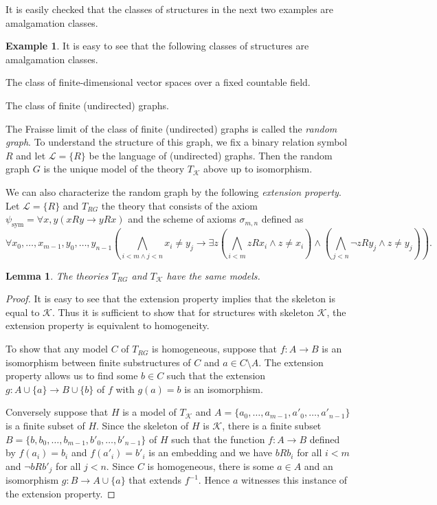 \documentclass[10pt]{amsart}
\renewcommand{\L}{\mathcal{L}}
\newcommand{\K}{\mathcal{K}}
\newtheorem{lemma}[theorem]{Lemma}
\theoremstyle{definition}
\newtheorem{example}[theorem]{Example}
\theoremstyle{remark}
\newenvironment{enumerate-(a)}{\begin{enumerate}[label={\upshape (\alph*)}, leftmargin=2pc]}{\end{enumerate}}
\begin{document}
It is easily checked that the classes of structures in the next two examples are amalgamation classes. 

\begin{example} 
It is easy to see that the following classes of structures are amalgamation classes. 
\begin{enumerate-(a)} 
\item 
The class of finite-dimensional vector spaces over a fixed countable field. 
\item 
The class of finite (undirected) graphs. 
\end{enumerate-(a)} 
\end{example} 

The Fraisse limit of the class of finite (undirected) graphs is called the \emph{random graph}. To understand the structure of this graph, we fix a binary relation symbol $R$ and let $\L=\{R\}$ be the language of (undirected) graphs. Then the random graph $G$ is the unique model of the theory $T_\K$ above up to isomorphism. 

We can also characterize the random graph by the following \emph{extension property}. Let $\L=\{R\}$ and $T_{RG}$ the theory that consists of the axiom $\psi_{\mathrm{sym}}=\forall x,y(xRy\rightarrow yRx)$ and the scheme of axioms $\sigma_{m,n}$ defined as 
$$\forall x_0,\dots,x_{m-1},y_0,\dots,y_{n-1}(\bigwedge_{i<m\wedge j<n} x_i\neq y_j \rightarrow \exists z (\bigwedge_{i<m} z R x_i\wedge z\neq x_i)\wedge (\bigwedge_{j<n}\neg zR y_j\wedge z\neq y_j)).$$ 

\begin{lemma} 
The theories $T_{RG}$ and $T_\K$ have the same models. 
\end{lemma} 
\begin{proof} 
It is easy to see that the extension property implies that the skeleton is equal to $\K$. Thus it is sufficient to show that for structures with skeleton $\K$, the extension property is equivalent to homogeneity. 

To show that any model $C$ of $T_{RG}$ is homogeneous, suppose that $f\colon A\rightarrow B$ is an isomorphism between finite substructures of $C$ and $a\in C\setminus A$. The extension property allows us to find some $b\in C$ such that the extension $g\colon A\cup\{a\}\rightarrow B\cup\{b\}$ of $f$ with $g(a)=b$ is an isomorphism. 

Conversely suppose that $H$ is a model of $T_\K$ and $A=\{a_0,\dots,a_{m-1},a'_0,\dots,a'_{n-1}\}$ is a finite subset of $H$. Since the skeleton of $H$ is $\K$, there is a finite subset $B=\{b,b_0,\dots,b_{m-1},b'_0,\dots, b'_{n-1}\}$ of $H$ such that the function $f\colon A\rightarrow B$ defined by $f(a_i)=b_i$ and $f(a'_i)=b'_i$ is an embedding and we have $bRb_i$ for all $i<m$ and $\neg bRb'_j$ for all $j<n$. Since $C$ is homogeneous, there is some $a\in A$ and an isomorphism $g\colon B\rightarrow A\cup\{a\}$ that extends $f^{-1}$. Hence $a$ witnesses this instance of the extension property. 
\end{proof} 
\end{document}
